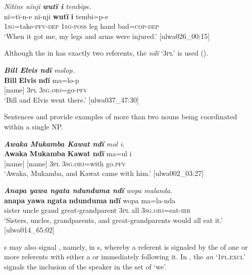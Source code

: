 \ea%
    \label{ex:complex:5}
            \textit{Nïtïne nïnji \textbf{wutï i} tembipe.}\\
\gll    nï=tï-n-e        nï-nji    \textbf{wutï}  \textbf{i}    tembi=p-e\\
    1\textsc{sg}=take-\textsc{pfv-dep}  1\textsc{sg-poss}  leg    hand  bad=\textsc{cop{}-dep}\\
\glt `When it got me, my legs and arms were injured.’ [ulwa026\_00:15]
\z

Although the  in  has exactly two referents, the   \textit{ndï} ‘\textsc{3pl}’ is used ().

\ea%
    \label{ex:complex:6}
            \textit{\textbf{Bill Elvis ndï} molop.}\\
\gll    \textbf{Bill}  \textbf{Elvis}  \textbf{ndï}  ma=lo-p\\
    [name]  [name]  3\textsc{pl}  3\textsc{sg.obj}=go-\textsc{pfv}\\
\glt `Bill and Elvis went there.’ [ulwa037\_47:30]
\z

Sentences  and  provide examples of more than two nouns being coordinated within a single NP.

\ea%
    \label{ex:complex:7}
            \textit{\textbf{Awaka Mukamba Kawat ndï} mol i.}\\
\gll    \textbf{Awaka}  \textbf{Mukamba}  \textbf{Kawat}  \textbf{ndï}  ma=ul       i\\
    [name]  [name]      [name]  3\textsc{pl}  3\textsc{sg.obj}=with  go.\textsc{pfv}\\
\glt `Awaka, Mukamba, and Kawat came with him.’ [ulwa002\_03:27]
\z

\ea%
    \label{ex:complex:8}
            \textit{\textbf{Anapa yawa ngata ndunduma ndï} wopa malanda.}\\
\gll    \textbf{anapa}  \textbf{yawa}  \textbf{ngata}  \textbf{ndunduma}    \textbf{ndï}  wopa  ma=la-nda\\
    sister  uncle  grand  great-grandparent  3\textsc{pl}  all    3\textsc{sg.obj}=eat-\textsc{irr}\\
\glt `Sisters, uncles, grandparents, and great-grandparents would all eat it.’ [ulwa014\_65:02]
\z

s may also signal , namely, in s, whereby a  referent is signaled by the  of one or more referents with either a  or   immediately following it. In , the  \textit{an} ‘1\textsc{pl.excl}’ signals the inclusion of the speaker in the set of ‘we’.


